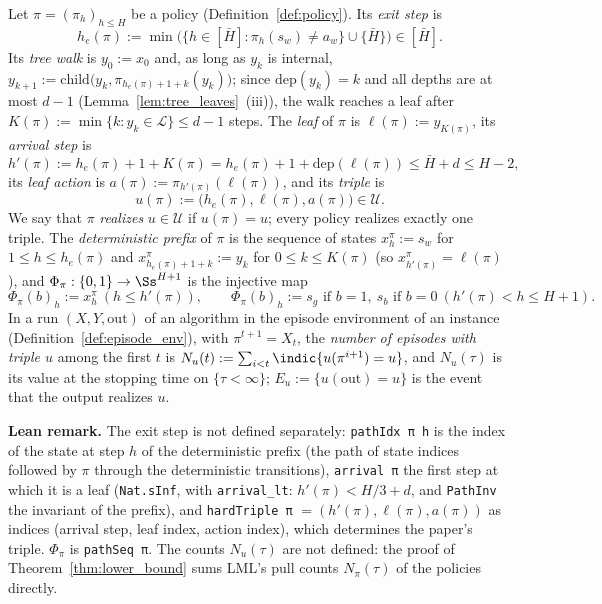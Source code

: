 \begin{definition}\label{def:hard_triple}
\leanok
Let $\pi = (\pi_h)_{h \le H}$ be a policy (Definition~\ref{def:policy}). Its \emph{exit step} is
\[
  h_e(\pi) := \min\big(\{h \in [\bar H] : \pi_h(s_w) \ne a_w\} \cup \{\bar H\}\big) \in [\bar H] .
\]
Its \emph{tree walk} is $y_0 := x_0$ and, as long as $y_k$ is internal,
$y_{k+1} := \mathrm{child}\big(y_k, \pi_{h_e(\pi) + 1 + k}(y_k)\big)$; since
$\mathrm{dep}(y_k) = k$ and all depths are at most $d - 1$ (Lemma~\ref{lem:tree_leaves}~(iii)),
the walk reaches a leaf after $K(\pi) := \min\{k : y_k \in \mathcal L\} \le d - 1$ steps. The
\emph{leaf} of $\pi$ is $\ell(\pi) := y_{K(\pi)}$, its \emph{arrival step} is
\[
  h'(\pi) := h_e(\pi) + 1 + K(\pi) = h_e(\pi) + 1 + \mathrm{dep}(\ell(\pi)) \le \bar H + d \le H - 2,
\]
its \emph{leaf action} is $a(\pi) := \pi_{h'(\pi)}(\ell(\pi))$, and its \emph{triple} is
\[
  u(\pi) := \big(h_e(\pi), \ell(\pi), a(\pi)\big) \in \mathcal U .
\]
We say that $\pi$ \emph{realizes} $u \in \mathcal U$ if $u(\pi) = u$; every policy realizes
exactly one triple. The \emph{deterministic prefix} of $\pi$ is the sequence of states
$x^\pi_h := s_w$ for $1 \le h \le h_e(\pi)$ and $x^\pi_{h_e(\pi) + 1 + k} := y_k$ for
$0 \le k \le K(\pi)$ (so $x^\pi_{h'(\pi)} = \ell(\pi)$), and
$\Phi_\pi : \{0, 1\} \to \Ss^{H+1}$ is the injective map
\[
  \Phi_\pi(b)_h := x^\pi_h \ (h \le h'(\pi)), \qquad \Phi_\pi(b)_h := s_g \text{ if } b = 1,\ s_b \text{ if } b = 0 \ (h'(\pi) < h \le H + 1).
\]
In a run $(X, Y, \mathrm{out})$ of an algorithm in the episode environment of an instance
(Definition~\ref{def:episode_env}), with $\pi^{t+1} = X_t$, the \emph{number of episodes with
triple $u$} among the first $t$ is $N_u(t) := \sum_{i < t}\indic\{u(\pi^{i+1}) = u\}$, and
$N_u(\tau)$ is its value at the stopping time on $\{\tau < \infty\}$; $E_u := \{u(\mathrm{out}) = u\}$
is the event that the output realizes $u$.
\end{definition}

\textbf{Lean remark.} The exit step is not defined separately: \texttt{pathIdx π h} is the index of the
state at step $h$ of the deterministic prefix (the path of state indices followed by $\pi$ through the
deterministic transitions), \texttt{arrival π} the first step at which it is a leaf
(\texttt{Nat.sInf}, with \texttt{arrival\_lt}: $h'(\pi) < H/3 + d$, and \texttt{PathInv} the invariant of
the prefix), and \texttt{hardTriple π} $= (h'(\pi), \ell(\pi), a(\pi))$ as indices (arrival step, leaf
index, action index), which determines the paper's triple. $\Phi_\pi$ is \texttt{pathSeq π}. The counts
$N_u(\tau)$ are not defined: the proof of Theorem~\ref{thm:lower_bound} sums LML's pull counts
$N_\pi(\tau)$ of the policies directly.

